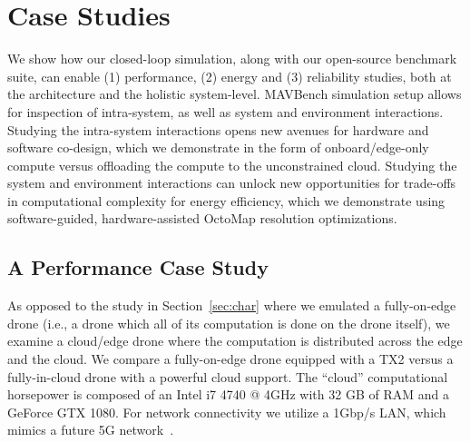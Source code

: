  
\label{sec:energy-case-study}
\section{Case Studies}
\label{sec:case-study}


We show how our closed-loop simulation, along with our open-source benchmark suite, can enable (1) performance, (2) energy and (3) reliability studies, both at the architecture and the holistic system-level. MAVBench simulation setup allows for inspection of intra-system, as well as system and environment interactions. Studying the intra-system interactions opens new avenues for hardware and software co-design, which we demonstrate in the form of onboard/edge-only compute versus offloading the compute to the unconstrained cloud. Studying the system and environment interactions can unlock new opportunities for trade-offs in computational complexity for energy efficiency, which we demonstrate using software-guided, hardware-assisted OctoMap resolution optimizations.

\subsection{A Performance Case Study}


As opposed to the study in Section~\ref{sec:char} where we emulated a fully-on-edge drone (i.e., a drone which all of its computation is done on the drone itself), we examine a cloud/edge drone where the computation is distributed across the edge and the cloud. We compare a fully-on-edge drone equipped with a TX2 versus a fully-in-cloud drone with a powerful cloud support. The ``cloud'' computational horsepower is composed of an Intel i7 4740 @ 4GHz with 32 GB of RAM and a GeForce GTX 1080. For network connectivity we utilize a 1Gbp/s LAN, which mimics a future 5G network~\cite{agyapong2014design, gupta2015survey}.

